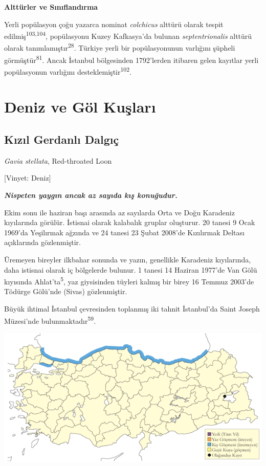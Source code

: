 \documentclass[
  letterpaper,
  DIV=11,
  numbers=noendperiod]{scrreprt}
\begin{document}
\textbf{Alttürler ve Sınıflandırma}

Yerli popülasyon çoğu yazarca nominat \emph{colchicus} alttürü olarak
tespit edilmiş\textsuperscript{103,104}, popülasyonu Kuzey Kafkasya'da
bulunan \emph{septentrionalis} alttürü olarak
tanımlamıştır\textsuperscript{28}. Türkiye yerli bir popülasyonunun
varlığını şüpheli görmüştür\textsuperscript{81}. Ancak İstanbul
bölgesinden 1792'lerden itibaren gelen kayıtlar yerli popülasyonun
varlığını desteklemiştir\textsuperscript{102}.


\chapter{Deniz ve Göl Kuşları}\label{deniz-ve-guxf6l-kuux15flarux131}

\section{Kızıl Gerdanlı
Dalgıç}\label{kux131zux131l-gerdanlux131-dalgux131uxe7}

\emph{Gavia stellata}, Red-throated Loon

{[}Vinyet: Deniz{]}

\textbf{\emph{Nispeten yaygın ancak az sayıda kış konuğudur.}}

Ekim sonu ile haziran başı arasında az sayılarda Orta ve Doğu Karadeniz
kıyılarında görülür. İstisnai olarak kalabalık gruplar oluşturur. 20
tanesi 9 Ocak 1969'da Yeşilırmak ağzında ve 24 tanesi 23 Şubat 2008'de
Kızılırmak Deltası açıklarında gözlenmiştir.

Üremeyen bireyler ilkbahar sonunda ve yazın, genellikle Karadeniz
kıyılarında, daha istisnai olarak iç bölgelerde bulunur. 1 tanesi 14
Haziran 1977'de Van Gölü kıyısında Ahlat'ta\textsuperscript{5}, yaz
giysisinden tüyleri kalmış bir birey 16 Temmuz 2003'de Tödürge Gölü'nde
(Sivas) gözlenmiştir.

Büyük ihtimal İstanbul çevresinden toplanmış iki tahnit İstanbul'da
Saint Joseph Müzesi'nde bulunmaktadır\textsuperscript{59}.

\includegraphics{images/harita_Page_045.png}
\end{document}
